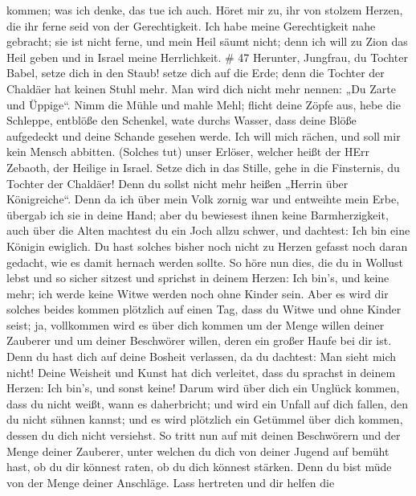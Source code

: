 kommen; was ich denke, das tue ich auch.  Höret mir zu, ihr
von stolzem Herzen, die ihr ferne seid von der Gerechtigkeit.
 Ich habe meine Gerechtigkeit nahe gebracht; sie ist nicht
ferne, und mein Heil säumt nicht; denn ich will zu Zion das Heil geben
und in Israel meine Herrlichkeit. \# 47  Herunter, Jungfrau,
du Tochter Babel, setze dich in den Staub! setze dich auf die Erde; denn
die Tochter der Chaldäer hat keinen Stuhl mehr. Man wird dich nicht mehr
nennen: „Du Zarte und Üppige``.  Nimm die Mühle und mahle
Mehl; flicht deine Zöpfe aus, hebe die Schleppe, entblöße den Schenkel,
wate durchs Wasser,  dass deine Blöße aufgedeckt und deine
Schande gesehen werde. Ich will mich rächen, und soll mir kein Mensch
abbitten.  (Solches tut) unser Erlöser, welcher heißt der
HErr Zebaoth, der Heilige in Israel.  Setze dich in das
Stille, gehe in die Finsternis, du Tochter der Chaldäer! Denn du sollst
nicht mehr heißen „Herrin über Königreiche``.  Denn da ich
über mein Volk zornig war und entweihte mein Erbe, übergab ich sie in
deine Hand; aber du bewiesest ihnen keine Barmherzigkeit, auch über die
Alten machtest du ein Joch allzu schwer,  und dachtest: Ich
bin eine Königin ewiglich. Du hast solches bisher noch nicht zu Herzen
gefasst noch daran gedacht, wie es damit hernach werden sollte.
 So höre nun dies, die du in Wollust lebst und so sicher
sitzest und sprichst in deinem Herzen: Ich bin's, und keine mehr; ich
werde keine Witwe werden noch ohne Kinder sein.  Aber es
wird dir solches beides kommen plötzlich auf einen Tag, dass du Witwe
und ohne Kinder seist; ja, vollkommen wird es über dich kommen um der
Menge willen deiner Zauberer und um deiner Beschwörer willen, deren ein
großer Haufe bei dir ist.  Denn du hast dich auf deine
Bosheit verlassen, da du dachtest: Man sieht mich nicht! Deine Weisheit
und Kunst hat dich verleitet, dass du sprachst in deinem Herzen: Ich
bin's, und sonst keine!  Darum wird über dich ein Unglück
kommen, dass du nicht weißt, wann es daherbricht; und wird ein Unfall
auf dich fallen, den du nicht sühnen kannst; und es wird plötzlich ein
Getümmel über dich kommen, dessen du dich nicht versiehst. 
So tritt nun auf mit deinen Beschwörern und der Menge deiner Zauberer,
unter welchen du dich von deiner Jugend auf bemüht hast, ob du dir
könnest raten, ob du dich könnest stärken.  Denn du bist
müde von der Menge deiner Anschläge. Lass hertreten und dir helfen die
